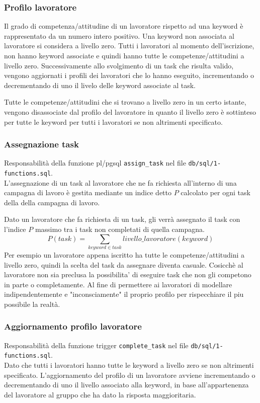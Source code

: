 \documentclass[a4paper]{article}
\begin{document}
\subsubsection{Profilo lavoratore}
Il grado di competenza/attitudine di un lavoratore rispetto ad una keyword è rappresentato da un numero intero positivo.
Una keyword non associata al lavoratore si considera a livello zero.
Tutti i lavoratori al momento dell'iscrizione, non hanno keyword associate e quindi hanno tutte le competenze/attitudini a livello zero.
Successivamente allo svolgimento di un task che risulta valido, vengono aggiornati i profili dei lavoratori che lo hanno eseguito, incrementando o decrementando di uno il livelo delle keyword associate al task.

Tutte le competenze/attitudini che si trovano a livello zero in un certo istante, vengono disassociate dal profilo del lavoratore in quanto il livello zero è sottinteso per tutte le keyword per tutti i lavoratori se non altrimenti specificato.

\subsubsection{Assegnazione task}
Responsabilit\`a della funzione pl/pgsql \verb|assign_task| nel file \verb|db/sql/1-functions.sql|.\\

L'assegnazione di un task al lavoratore che ne fa richiesta all'interno di una campagna di lavoro è gestita mediante un indice detto $P$ calcolato per ogni task della della campagna di lavoro.

Dato un lavoratore che fa richiesta di un task, gli verr\`a assegnato il task con l'indice $P$ massimo tra i task non completati di quella campagna.
$$
P(task) = \sum_{keyword \in task}{livello\_lavoratore(keyword)}
$$
Per esempio un lavoratore appena iscritto ha tutte le competenze/attitudini a livello zero, quindi la scelta del task da assegnare diventa casuale.
Cosicch\`e al lavoratore non sia preclusa la possibilita' di eseguire task che non gli competono in parte o completamente. Al fine di permettere ai lavoratori di modellare indipendentemente e "inconsciamente" il proprio profilo per rispecchiare il piu possibile la realt\`{a}.

\subsubsection{Aggiornamento profilo lavoratore}
Responsabilit\`{a} della funzione trigger \verb|complete_task| nel file \verb|db/sql/1-functions.sql|.
\\
Dato che tutti i lavoratori hanno tutte le keyword a livello zero se non altrimenti specificato.
L'aggiornamento del profilo di un lavoratore avviene incrementando o decrementando di uno il livello associato alla keyword, in base all'appartenenza del lavoratore al gruppo che ha dato la risposta maggioritaria.
\end{document}
